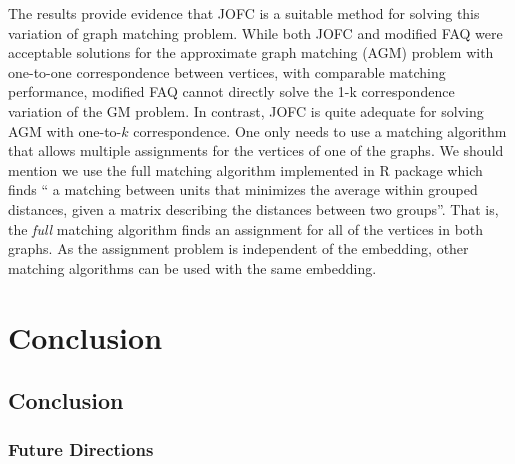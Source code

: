 \documentclass[12pt,oneside,final]{thesis}\usepackage[]{graphicx}\usepackage[]{color}
\begin{document}
The results provide evidence that JOFC is a suitable method for solving this variation of graph matching problem. While  both JOFC and modified FAQ were acceptable solutions for the approximate graph matching (AGM) problem with one-to-one correspondence between vertices, with comparable matching performance, modified FAQ  cannot directly solve  the 1-k correspondence variation of the GM problem. In contrast, JOFC is quite adequate for solving AGM with one-to-$k$ correspondence. One only needs to use a matching algorithm that allows multiple assignments for the vertices of one of the graphs. We should mention we use the full matching algorithm implemented in R package \cite{optmatch} which finds  `` a matching between units that minimizes the average within grouped distances, given a matrix describing the distances between two groups''\cite{optmatch_manual}. That is, the \emph{full} matching algorithm finds an assignment for all of the vertices in both graphs. As the assignment problem is independent of the embedding, other matching algorithms can be used with the same embedding.



\chapter{Conclusion}
\label{sec:conclusion}

\section{Conclusion}
\subsection{Future Directions}








% 
% 
% 
% 
% 
\end{document}
